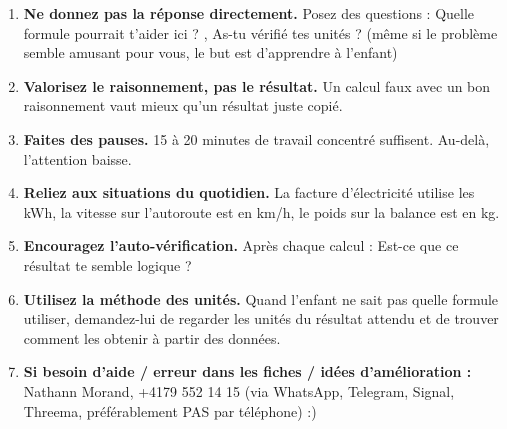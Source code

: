 \documentclass[11pt,a4paper]{article}
\begin{document}
\begin{enumerate}
\item \textbf{Ne donnez pas la r\'eponse directement.} Posez des questions : \guillemotleft{} Quelle formule pourrait t'aider ici ? \guillemotright{}, \guillemotleft{} As-tu v\'erifi\'e tes unit\'es ? \guillemotright{} (m\^eme si le probl\`eme semble amusant pour vous, le but est d'apprendre \`a l'enfant)
\item \textbf{Valorisez le raisonnement, pas le r\'esultat.} Un calcul faux avec un bon raisonnement vaut mieux qu'un r\'esultat juste copi\'e.
\item \textbf{Faites des pauses.} 15 \`a 20 minutes de travail concentr\'e suffisent. Au-del\`a, l'attention baisse.
\item \textbf{Reliez aux situations du quotidien.} La facture d'\'electricit\'e utilise les kWh, la vitesse sur l'autoroute est en km/h, le poids sur la balance est en kg.
\item \textbf{Encouragez l'auto-v\'erification.} Apr\`es chaque calcul : \guillemotleft{} Est-ce que ce r\'esultat te semble logique ? \guillemotright{}
\item \textbf{Utilisez la m\'ethode des unit\'es.} Quand l'enfant ne sait pas quelle formule utiliser, demandez-lui de regarder les unit\'es du r\'esultat attendu et de trouver comment les obtenir \`a partir des donn\'ees.
\item \textbf{Si besoin d'aide / erreur dans les fiches / idées d'amélioration :} Nathann Morand, +4179 552 14 15 (via WhatsApp, Telegram, Signal, Threema, pr\'ef\'erablement PAS par t\'el\'ephone) :)
\end{enumerate}
\end{document}
